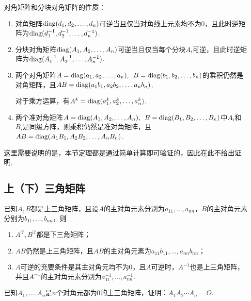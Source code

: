 \begin{theorem}
    对角矩阵和分块对角矩阵的性质：
    \begin{enumerate}
        \item 对角矩阵$\operatorname{diag}(d_1,d_2,\ldots,d_n)$可逆当且仅当对角线上元素均不为0，且此时逆矩阵为$\operatorname{diag}(d_1^{-1},d_2^{-1},\ldots,d_n^{-1})$.

        \item 分块对角矩阵$\operatorname{diag}(A_1,A_2,\ldots,A_n)$可逆当且仅当每个分块$A_i$可逆，且此时逆矩阵为$\operatorname{diag}(A_1^{-1},A_2^{-1},\ldots,A_n^{-1})$.

        \item 两个对角矩阵$A=\operatorname{diag}(a_1,a_2,\ldots,a_n),\enspace B=\operatorname{diag}(b_1,b_2,\ldots,b_n)$的乘积仍然是对角矩阵，且$AB=\operatorname{diag}(a_1b_1,a_2b_2,\ldots,a_nb_n)$.

              对于乘方运算，有$A^k=\operatorname{diag}(a_1^k,a_2^k,\ldots,a_n^k)$.

        \item 两个准对角矩阵$A=\operatorname{diag}(A_1,A_2,\ldots,A_n),\enspace B=\operatorname{diag}(B_1,B_2,\ldots,B_n)$中$A_i$和$B_i$是同级方阵，则乘积仍然是准对角矩阵，且$AB=\operatorname{diag}(A_1B_1,A_2B_2,\ldots,A_nB_n)$.
    \end{enumerate}
\end{theorem}

这里需要说明的是，本节定理都是通过简单计算即可验证的，因此在此不给出证明.

\subsection{上（下）三角矩阵}

\begin{theorem}
    已知$A,B$都是上三角矩阵，且设$A$的主对角元素分别为$a_{11},\ldots,a_{nn}$，$B$的主对角元素分别为$b_{11},\ldots,b_{nn}$，则
    \begin{enumerate}
        \item $A^{\mathrm{T}}, B^\mathrm{T}$都是下三角矩阵；

        \item $AB$仍然是上三角矩阵，且$AB$的主对角元素为$a_{11}b_{11},\ldots,a_{nn}b_{nn}$；

        \item $A$可逆的充要条件是其主对角元均不为0，且$A$可逆时，$A^{-1}$也是上三角矩阵，并且$A^{-1}$的主对角元素分别为$a_{11}^{-1},\ldots,a_{nn}^{-1}$.
    \end{enumerate}
\end{theorem}

\begin{example}
    已知$A_1,\ldots,A_n$是$n$个对角元都为0的上三角矩阵，证明：$A_1A_2\cdots A_n=O$.
\end{example}

